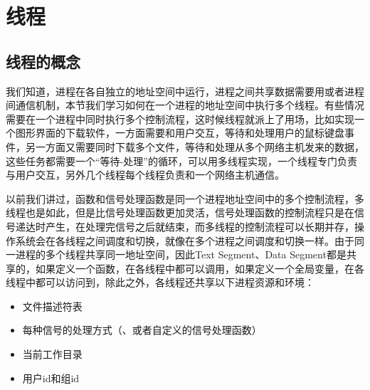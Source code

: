 

\chapter{线程}
%





\section{线程的概念}
%
我们知道，进程在各自独立的地址空间中运行，进程之间共享数据需要用或者进程间通信机制，本节我们学习如何在一个进程的地址空间中执行多个线程。有些情况需要在一个进程中同时执行多个控制流程，这时候线程就派上了用场，比如实现一个图形界面的下载软件，一方面需要和用户交互，等待和处理用户的鼠标键盘事件，另一方面又需要同时下载多个文件，等待和处理从多个网络主机发来的数据，这些任务都需要一个“等待-处理”的循环，可以用多线程实现，一个线程专门负责与用户交互，另外几个线程每个线程负责和一个网络主机通信。



以前我们讲过，函数和信号处理函数是同一个进程地址空间中的多个控制流程，多线程也是如此，但是比信号处理函数更加灵活，信号处理函数的控制流程只是在信号递达时产生，在处理完信号之后就结束，而多线程的控制流程可以长期并存，操作系统会在各线程之间调度和切换，就像在多个进程之间调度和切换一样。由于同一进程的多个线程共享同一地址空间，因此Text Segment、Data Segment都是共享的，如果定义一个函数，在各线程中都可以调用，如果定义一个全局变量，在各线程中都可以访问到，除此之外，各线程还共享以下进程资源和环境：


\begin{itemize}

\item 文件描述符表

\item 每种信号的处理方式（、或者自定义的信号处理函数）

\item 当前工作目录

\item 用户id和组id
\end{itemize}


